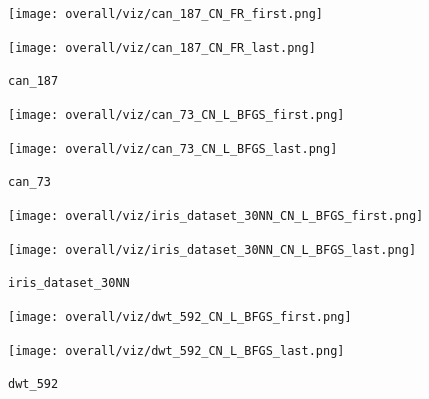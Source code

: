 \documentclass[dvipdfmx,10pt,journal,compsoc]{IEEEtran}
\begin{document}
\begin{figure}[t]
    \centering
    \begin{minipage}{0.49\columnwidth}
        \centering
        \texttt{[image: overall/viz/can\_187\_CN\_FR\_first.png]}
    \end{minipage}
    \begin{minipage}{0.49\columnwidth}
        \centering
        \texttt{[image: overall/viz/can\_187\_CN\_FR\_last.png]}
    \end{minipage}
    \caption{\texttt{can\_187}}
    \label{fig:can_187}
\end{figure}
\begin{figure}[t]
    \centering
    \begin{minipage}{0.49\columnwidth}
        \centering
        \texttt{[image: overall/viz/can\_73\_CN\_L\_BFGS\_first.png]}
    \end{minipage}
    \begin{minipage}{0.49\columnwidth}
        \centering
        \texttt{[image: overall/viz/can\_73\_CN\_L\_BFGS\_last.png]}
    \end{minipage}
    \caption{\texttt{can\_73}}
    \label{fig:can_73}
\end{figure}
\begin{figure}[t]
    \centering
    \begin{minipage}{0.49\columnwidth}
        \centering
        \texttt{[image: overall/viz/iris\_dataset\_30NN\_CN\_L\_BFGS\_first.png]}
    \end{minipage}
    \begin{minipage}{0.49\columnwidth}
        \centering
        \texttt{[image: overall/viz/iris\_dataset\_30NN\_CN\_L\_BFGS\_last.png]}
    \end{minipage}
    \caption{\texttt{iris\_dataset\_30NN}}
    \label{fig:iris_dataset_30NN}
\end{figure}
\begin{figure}[t]
    \centering
    \begin{minipage}{0.49\columnwidth}
        \centering
        \texttt{[image: overall/viz/dwt\_592\_CN\_L\_BFGS\_first.png]}
    \end{minipage}
    \begin{minipage}{0.49\columnwidth}
        \centering
        \texttt{[image: overall/viz/dwt\_592\_CN\_L\_BFGS\_last.png]}
    \end{minipage}
    \caption{\texttt{dwt\_592}}
    \label{fig:dwt_592}
\end{figure}
\end{document}
